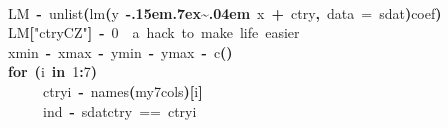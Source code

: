 \documentclass[a4paper]{article}
\newcommand{\hlnumber}[1]{\textcolor[rgb]{0.0823529411764706,0.0784313725490196,0.709803921568627}{#1}}%
\newcommand{\hlfunctioncall}[1]{\textcolor[rgb]{1,0,0}{#1}}%
\newcommand{\hlstring}[1]{\textcolor[rgb]{0.6,0.6,1}{#1}}%
\newcommand{\hlkeyword}[1]{\textcolor[rgb]{0,0,0}{\textbf{#1}}}%
\newcommand{\hlargument}[1]{\textcolor[rgb]{0.694117647058824,0.247058823529412,0.0196078431372549}{#1}}%
\newcommand{\hlcomment}[1]{\textcolor[rgb]{0.8,0.8,0.8}{#1}}%
\newcommand{\hlassignement}[1]{\textcolor[rgb]{0.215686274509804,0.215686274509804,0.384313725490196}{\textbf{#1}}}%
\newcommand{\hlsymbol}[1]{\textcolor[rgb]{0,0,0}{#1}}%
\newcommand{\hlprompt}[1]{\textcolor[rgb]{0,0,0}{#1}}%
\def\urltilda{\kern -.15em\lower .7ex\hbox{\~{}}\kern .04em}%
\newcommand{\hlstd}[1]{\textcolor[rgb]{0,0,0}{#1}}%
\newenvironment{Houtput}{\raggedright}{%
%
}
\begin{document}
\begin{Houtput}
\hspace*{\fill}\\
\hlstd{}\ttfamily\noindent
\hlprompt{\usebox{\hlnormalsizeboxgreaterthan}{\ }}\hlsymbol{LM}{\ }\hlassignement{\usebox{\hlnormalsizeboxlessthan}-}{\ }\hlfunctioncall{unlist}\hlkeyword{(}\hlfunctioncall{lm}\hlkeyword{(}\hlsymbol{y}{\ }\hlkeyword{\urltilda{}}{\ }\hlsymbol{x}{\ }\hlkeyword{+}{\ }\hlsymbol{ctry}\hlkeyword{,}{\ }\hlargument{data}{\ }\hlargument{=}{\ }\hlsymbol{sdat}\hlkeyword{)}\hlkeyword{\usebox{\hlnormalsizeboxdollar}}\hlsymbol{coef}\hlkeyword{)}\mbox{}
\normalfont
\hspace*{\fill}\\
\hlstd{}\ttfamily\noindent
\hlprompt{\usebox{\hlnormalsizeboxgreaterthan}{\ }}\hlsymbol{LM}\hlkeyword{[}\hlstring{"ctryCZ"}\hlkeyword{]}{\ }\hlassignement{\usebox{\hlnormalsizeboxlessthan}-}{\ }\hlnumber{0}{\ }{\ }\hlcomment{\usebox{\hlnormalsizeboxhash}{\ }a{\ }hack{\ }to{\ }make{\ }life{\ }easier}\mbox{}
\normalfont
\hspace*{\fill}\\
\hlstd{}\ttfamily\noindent
\hlprompt{\usebox{\hlnormalsizeboxgreaterthan}{\ }}\hlsymbol{xmin}{\ }\hlassignement{\usebox{\hlnormalsizeboxlessthan}-}{\ }\hlsymbol{xmax}{\ }\hlassignement{\usebox{\hlnormalsizeboxlessthan}-}{\ }\hlsymbol{ymin}{\ }\hlassignement{\usebox{\hlnormalsizeboxlessthan}-}{\ }\hlsymbol{ymax}{\ }\hlassignement{\usebox{\hlnormalsizeboxlessthan}-}{\ }\hlfunctioncall{c}\hlkeyword{(}\hlkeyword{)}\mbox{}
\normalfont
\hspace*{\fill}\\
\hlstd{}\ttfamily\noindent
\hlprompt{\usebox{\hlnormalsizeboxgreaterthan}{\ }}\hlkeyword{for}{\ }\hlkeyword{(}\hlsymbol{i}{\ }\hlkeyword{in}{\ }\hlnumber{1}\hlkeyword{:}\hlnumber{7}\hlkeyword{)}{\ }\hlkeyword{\usebox{\hlnormalsizeboxopenbrace}}\hspace*{\fill}\\
\hlstd{}\hlprompt{{\ }}{\ }{\ }{\ }{\ }\hlsymbol{ctryi}{\ }\hlassignement{\usebox{\hlnormalsizeboxlessthan}-}{\ }\hlfunctioncall{names}\hlkeyword{(}\hlsymbol{my7cols}\hlkeyword{)}\hlkeyword{[}\hlsymbol{i}\hlkeyword{]}\hspace*{\fill}\\
\hlstd{}\hlprompt{{\ }}{\ }{\ }{\ }{\ }\hlsymbol{ind}{\ }\hlassignement{\usebox{\hlnormalsizeboxlessthan}-}{\ }\hlsymbol{sdat}\hlkeyword{\usebox{\hlnormalsizeboxdollar}}\hlsymbol{ctry}{\ }=={\ }\hlsymbol{ctryi}\hspace*{\fill}\\

\end{Houtput}
\end{document}
